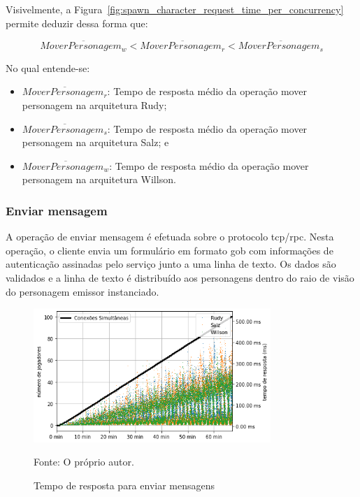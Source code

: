 Visivelmente, a Figura~\ref{fig:spawn_character_request_time_per_concurrency} permite deduzir dessa forma que:

$$
  \overline{MoverPersonagem_{w}} < \overline{MoverPersonagem_{r}} <\overline{MoverPersonagem_{s}}
$$

No qual entende-se:

\begin{itemize}
 \item $\overline{MoverPersonagem_{r}}$: Tempo de resposta médio da operação mover personagem na arquitetura Rudy;
 \item $\overline{MoverPersonagem_{s}}$: Tempo de resposta médio da operação mover personagem na arquitetura Salz; e
 \item $\overline{MoverPersonagem_{w}}$: Tempo de resposta médio da operação mover personagem na arquitetura Willson.
\end{itemize}


\subsubsection{Enviar mensagem}

A operação de enviar mensagem é efetuada sobre o protocolo \ac{tcp}/\ac{rpc}.
%
Nesta operação, o cliente envia um formulário em formato \ac{gob} com informações de autenticação assinadas pelo serviço junto a uma linha de texto.
%
Os dados são validados e a linha de texto é distribuído aos personagens dentro do raio de visão do personagem emissor instanciado.

\begin{figure}[htb!]
  \caption{Tempo de resposta para enviar mensagens}
  \label{fig:send_chat_request_time}
  \includegraphics[width=0.8\textwidth]{figuras/analise/rt/send_chat_request_time}
  \centering

  Fonte: O próprio autor.
\end{figure}

